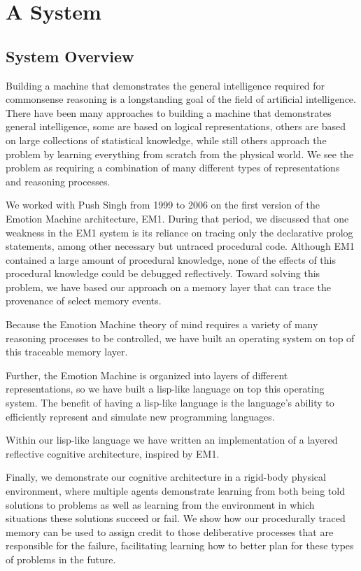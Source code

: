 \chapter{A System}\label{ch:a_system}

\section{System Overview}

Building a machine that demonstrates the general intelligence required
for commonsense reasoning is a longstanding goal of the field of
artificial intelligence.  There have been many approaches to building
a machine that demonstrates general intelligence, some are based on
logical representations, others are based on large collections of
statistical knowledge, while still others approach the problem by
learning everything from scratch from the physical world.  We see the
problem as requiring a combination of many different types of
representations and reasoning processes.

We worked with Push Singh from 1999 to 2006 on the first version of
the Emotion Machine architecture, EM1.  During that period, we
discussed that one weakness in the EM1 system is its reliance on
tracing only the declarative prolog statements, among other necessary
but untraced procedural code.  Although EM1 contained a large amount
of procedural knowledge, none of the effects of this procedural
knowledge could be debugged reflectively.  Toward solving this
problem, we have based our approach on a memory layer that can trace
the provenance of select memory events.

Because the Emotion Machine theory of mind requires a variety of many
reasoning processes to be controlled, we have built an operating
system on top of this traceable memory layer.

Further, the Emotion Machine is organized into layers of different
representations, so we have built a lisp-like language on top this
operating system.  The benefit of having a lisp-like language is the
language's ability to efficiently represent and simulate new
programming languages.

Within our lisp-like language we have written an implementation of a
layered reflective cognitive architecture, inspired by EM1.

Finally, we demonstrate our cognitive architecture in a rigid-body
physical environment, where multiple agents demonstrate learning from
both being told solutions to problems as well as learning from the
environment in which situations these solutions succeed or fail.  We
show how our procedurally traced memory can be used to assign credit
to those deliberative processes that are responsible for the failure,
facilitating learning how to better plan for these types of problems
in the future.

